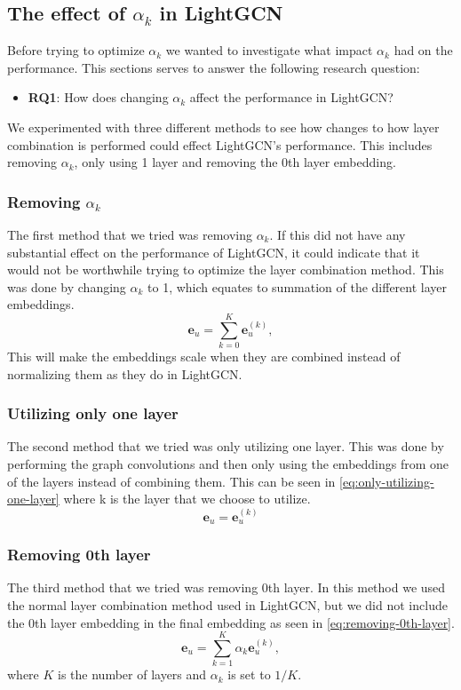 \subsection{The effect of $\alpha_k$ in LightGCN}\label{sec:method:alpha-k-effect}
Before trying to optimize $\alpha_k$ we wanted to investigate what impact $\alpha_k$ had on the performance.
This sections serves to answer the following research question:
\begin{itemize}
	\item \textbf{RQ1}: How does changing $\alpha_k$ affect the performance in LightGCN?
\end{itemize}
We experimented with three different methods to see how changes to how layer combination is performed could effect LightGCN's performance.
This includes removing $\alpha_k$, only using 1 layer and removing the 0th layer embedding.

\subsubsection{Removing $\alpha_k$}
The first method that we tried was removing $\alpha_k$.
If this did not have any substantial effect on the performance of LightGCN, it could indicate that it would not be worthwhile trying to optimize the layer combination method.
This was done by changing $\alpha_k$ to 1, which equates to summation of the different layer embeddings.
\begin{equation}
    \mathbf{e}_u = \sum_{k=0}^{K} \mathbf{e}_u^{(k)},
    \label{eq:removing-alpha-k-lightgcn-sum}
\end{equation}
This will make the embeddings scale when they are combined instead of normalizing them as they do in LightGCN.

\subsubsection{Utilizing only one layer}
The second method that we tried was only utilizing one layer.
This was done by performing the graph convolutions and then only using the embeddings from one of the layers instead of combining them.
This can be seen in \autoref{eq:only-utilizing-one-layer} where k is the layer that we choose to utilize. 
\begin{equation}
	\mathbf{e}_u = \mathbf{e}_u^{(k)}
	\label{eq:only-utilizing-one-layer}
\end{equation}

\subsubsection{Removing 0th layer}
The third method that we tried was removing 0th layer.
In this method we used the normal layer combination method used in LightGCN, but we did not include the 0th layer embedding in the final embedding as seen in \autoref{eq:removing-0th-layer}.
\begin{equation}
	\mathbf{e}_u = \sum_{k=1}^{K} \alpha_k \mathbf{e}_u^{(k)},
	\label{eq:removing-0th-layer}
\end{equation}
where $K$ is the number of layers and $\alpha_k$ is set to $1/K$.
